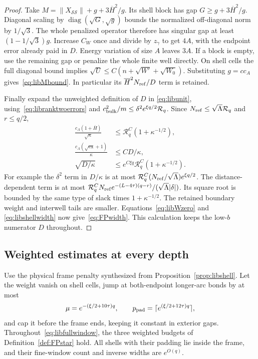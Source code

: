\begin{proof}
Take $M=\|X_{\mathcal S\mathcal S}\|+g+3\overline H^2/g$.
Its shell block has gap $G\ge g+3\overline H^2/g$.
Diagonal scaling by $\operatorname{diag}(\sqrt G,\sqrt g)$ bounds
the normalized off-diagonal norm by $1/\sqrt3$. The whole penalized
operator therefore has singular gap at least
$(1-1/\sqrt3)g$. Increase $C_W$ once and divide by $z_\gamma$ to get
$4A$, with the endpoint error already paid in $D$.
Energy variation of size $A$ leaves $3A$.
If a block is empty, use the remaining gap or penalize the whole
finite well directly.
On shell cells the full diagonal bound implies
$\sqrt U\le C(n+\sqrt{W'}+\sqrt{W_0})$.
Substituting $g=cc_A$ gives~\eqref{eq:libMbound}.
In particular its $\overline H^2N_{\rm ref}/D$ term is retained.

Finally expand the unweighted definition of $D$ in
\eqref{eq:libunit}, using~\eqref{eq:libranktwoerrors} and
$c_{\rm bulk}^2/m\le\delta^2e^{\xi q/2}\mathcal R_q$.
Since $N_{\rm ref}\le\sqrt\Lambda\mathcal R_q$ and $r\le q/2$,
\begin{align*}
 \frac{c_A(1+\overline H)}{\sqrt\kappa}
       &\le\mathcal R_q^C(1+\kappa^{-1/2}),\\
 \frac{c_A(\sqrt{\mathrm{ex}}+1)}\kappa&\le CD/\kappa,\\
 \sqrt{D/\kappa}&\le e^{C\xi q}\mathcal R_q^C(1+\kappa^{-1/2}).
\end{align*}
For example the $\delta^2$ term in $D/\kappa$ is at most
$\mathcal R_q^C(N_{\rm ref}/\sqrt\Lambda)e^{\xi q/2}$.
The distance-dependent term is at most
$\mathcal R_q^CN_{\rm ref}e^{-(L-4\tau)(q-r)}/
 (\sqrt\Lambda|\delta|)$.
Its square root is bounded by the same type of slack times
$1+\kappa^{-1/2}$. The retained boundary weight and interwell tails
are smaller. Equations~\eqref{eq:libWzero} and
\eqref{eq:libshellwidth} now give~\eqref{eq:FPwidth}.
This calculation keeps the low-$b$ numerator $D$ throughout.
\end{proof}

\subsection{Weighted estimates at every depth}

\begin{proposition}\label{prop:libweighted}
Use the physical frame penalty synthesized from
Proposition~\ref{prop:libshell}. Let the weight vanish on shell cells,
jump at both-endpoint longer-arc bonds by at most
\[
 \mu=e^{-(\xi/2+10\tau)q},\qquad
 p_{\rm pad}=\lceil e^{(\xi/2+12\tau)q}\rceil,
\]
and cap it before the frame ends, keeping it constant in exterior
gaps. Throughout~\eqref{eq:libfullwindow}, the three weighted
budgets of Definition~\ref{def:FPstar} hold. All shells with their
padding lie inside the frame, and their fine-window count and
inverse widths are $e^{O(q)}$.
\end{proposition}

